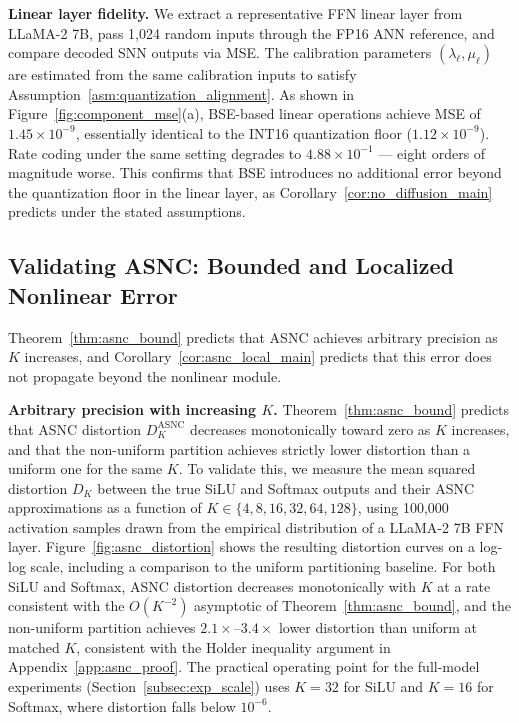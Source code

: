 \documentclass{article}
\theoremstyle{plain}
\theoremstyle{definition}
\theoremstyle{remark}
\begin{document}
\noindent\textbf{Linear layer fidelity.}
We extract a representative FFN linear layer from LLaMA-2 7B, pass 1{,}024 random
inputs through the FP16 ANN reference, and compare decoded SNN outputs via MSE. The
calibration parameters $(\lambda_\ell, \mu_\ell)$ are estimated from the same
calibration inputs to satisfy Assumption~\ref{asm:quantization_alignment}. As shown
in Figure~\ref{fig:component_mse}(a), BSE-based linear operations achieve MSE of
$1.45 \times 10^{-9}$, essentially identical to the INT16 quantization floor
($1.12 \times 10^{-9}$). Rate coding under the same setting degrades to
$4.88 \times 10^{-1}$ — eight orders of magnitude worse. This confirms that BSE
introduces no additional error beyond the quantization floor in the linear layer,
as Corollary~\ref{cor:no_diffusion_main} predicts under the stated assumptions.


\subsection{Validating ASNC: Bounded and Localized Nonlinear Error}
\label{subsec:exp_asnc}

Theorem~\ref{thm:asnc_bound} predicts that ASNC achieves arbitrary precision as $K$
increases, and Corollary~\ref{cor:asnc_local_main} predicts that this error does not
propagate beyond the nonlinear module.

\noindent\textbf{Arbitrary precision with increasing $K$.}
Theorem~\ref{thm:asnc_bound} predicts that ASNC distortion $D_K^{\mathrm{ASNC}}$
decreases monotonically toward zero as $K$ increases, and that the non-uniform
partition achieves strictly lower distortion than a uniform one for the same $K$.
To validate this, we measure the mean squared distortion $D_K$ between the true
SiLU and Softmax outputs and their ASNC approximations as a function of $K \in
\{4, 8, 16, 32, 64, 128\}$, using 100{,}000 activation samples drawn from the
empirical distribution of a LLaMA-2 7B FFN layer.
Figure~\ref{fig:asnc_distortion} shows the resulting distortion curves on a log-log
scale, including a comparison to the uniform partitioning baseline. For both SiLU
and Softmax, ASNC distortion decreases monotonically with $K$ at a rate consistent
with the $O(K^{-2})$ asymptotic of Theorem~\ref{thm:asnc_bound}, and the non-uniform
partition achieves $2.1\times$--$3.4\times$ lower distortion than uniform at matched
$K$, consistent with the Holder inequality argument in Appendix~\ref{app:asnc_proof}.
The practical operating point for the full-model experiments
(Section~\ref{subsec:exp_scale}) uses $K = 32$ for SiLU and $K = 16$ for Softmax,
where distortion falls below $10^{-6}$.
\end{document}
